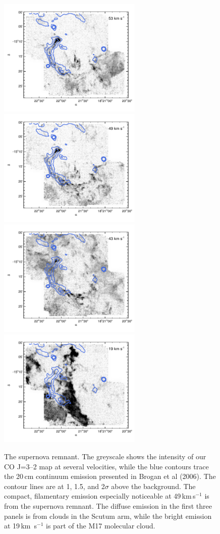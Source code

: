 \begin{figure}
\includegraphics[width=2.7in]{brogan_0}\hfill
\includegraphics[width=2.7in]{brogan_1}
\includegraphics[width=2.7in]{brogan_2}\hfill
\includegraphics[width=2.7in]{brogan_3}
\caption{The \snr{} supernova remnant. The greyscale shows the intensity of our CO J=3--2 map at several velocities, while the blue contours trace the 20\,cm continuum emission presented in Brogan et al (2006). The contour lines are at 1, 1.5, and 2$\sigma$ above the background. The compact, filamentary emission especially noticeable at 49\,km\,s$^{-1}$ is from the supernova remnant. The diffuse emission in the first three panels is from clouds in the Scutum arm, while the bright emission at 19\,km \,s$^{-1}$ is part of the M17 molecular cloud.}
\label{fig:brogan}
\end{figure}



